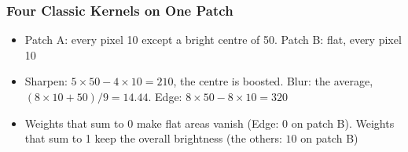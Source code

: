 \begin{frame}[fragile] \frametitle{Four Classic Kernels on One Patch}
\begin{center}
\scriptsize
\setlength{\arraycolsep}{2pt}
\end{center}
\begin{itemize}
\item Patch A: every pixel 10 except a bright centre of 50. Patch B: flat, every pixel 10
\end{itemize}
\begin{center}
\small
{}
\end{center}
\begin{itemize}
\item Sharpen: $5 \times 50 - 4 \times 10 = 210$, the centre is boosted. Blur: the average, $(8 \times 10 + 50)/9 = 14.44$. Edge: $8 \times 50 - 8 \times 10 = 320$
\item Weights that sum to 0 make flat areas vanish (Edge: $0$ on patch B). Weights that sum to 1 keep the overall brightness (the others: $10$ on patch B)
\end{itemize}
\end{frame}

